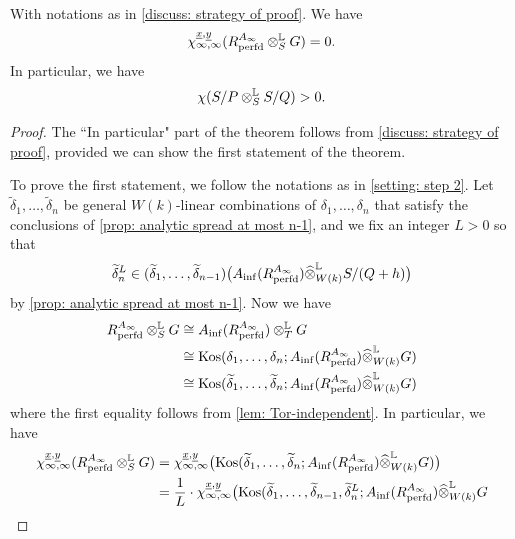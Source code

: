 \documentclass[12pt]{amsart}
\numberwithin{equation}{theorem}
\numberwithin{equation}{theorem}
\newcommand{\perfd}{\textnormal{perfd}}
\newcommand{\Kos}{\textnormal{Kos}}
\begin{document}
\begin{theorem}
\label{thm: vanishing and completion of proof}
With notations as in \autoref{discuss: strategy of proof}. %
We have
$$\chi_{\infty, \infty}^{\underline{x}, \underline{y}}(R^{A_\infty}_\perfd \otimes^\myL_SG) =0.$$
In particular, we have 
$$\chi(S/P \otimes_S^{\mathbb{L}} S/Q)>0.$$
\end{theorem}
\begin{proof}
The ``In particular" part of the theorem follows from \autoref{discuss: strategy of proof}, provided we can show the first statement of the theorem. 

To prove the first statement, we follow the notations as in \autoref{setting: step 2}. Let $\widetilde{\delta}_1,\dots,\widetilde{\delta}_n$ be general $W(k)$-linear combinations of $\delta_1,\dots,\delta_n$ that satisfy the conclusions of \autoref{prop: analytic spread at most n-1}, and we fix an integer $L>0$ so that 
\begin{equation}
\label{eqn: gen up to radical n-1 elts}
\widetilde{\delta}_n^L \in (\widetilde{\delta}_1,\dots,\widetilde{\delta}_{n-1})\big(A_{\inf}(R^{A_\infty}_\perfd) \widehat{\otimes}^\myL_{W(k)} S/(Q+h)\big)
\end{equation}
by \autoref{prop: analytic spread at most n-1}.  Now we have
\begin{align*}
R^{A_\infty}_\perfd \otimes^\myL_SG & \cong A_{\inf}(R^{A_\infty}_\perfd) \otimes^\myL_TG\\
& \cong \Kos(\delta_1,\dots,\delta_n; A_{\inf}(R^{A_\infty}_\perfd) \widehat{\otimes}^\myL_{W(k)}G) \\
& \cong  \Kos(\widetilde{\delta}_1,\dots,\widetilde{\delta}_n; A_{\inf}(R^{A_\infty}_\perfd) \widehat{\otimes}^\myL_{W(k)}G
) 
\end{align*}
where the first equality follows from \autoref{lem: Tor-independent}. In particular, we have 
\begin{align}
\label{eqn: reduction to diagonal}
\chi_{\infty, \infty}^{\underline{x}, \underline{y}}(R^{A_\infty}_\perfd \otimes^\myL_SG) & = \chi_{\infty, \infty}^{\underline{x}, \underline{y}}\big(\Kos(\widetilde{\delta}_1,\dots,\widetilde{\delta}_n; A_{\inf}(R^{A_\infty}_\perfd) \widehat{\otimes}^\myL_{W(k)}G
)\big) \notag \\
& = \frac{1}{L} \cdot \chi_{\infty, \infty}^{\underline{x}, \underline{y}}\big(\Kos(\widetilde{\delta}_1,\dots,\widetilde{\delta}_{n-1},\widetilde{\delta}_n^L; A_{\inf}(R^{A_\infty}_\perfd) \widehat{\otimes}^\myL_{W(k)}G

\end{align}
\end{proof}
\end{document}
